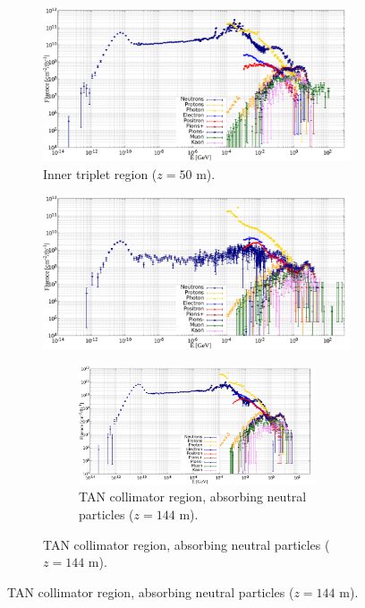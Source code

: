 \documentclass[encoding=utf8,british]{tumphthesis}
\begin{document}
\medskip

\begin{figure}[H]
    \centering 
\begin{subfigure}{0.69\textwidth}
    \centering
  \includegraphics[width=\linewidth]{results/particle_spectra_location_ITQ3.png}
  \caption{Inner triplet region ($z=50$ m).}
  \label{fig:LHC-particle-distributions-IT}
\end{subfigure}

\medskip

\begin{subfigure}{0.69\textwidth}
    \centering
  \includegraphics[width=\linewidth]{results/particle_spectra_location_TUN1.png}
  \caption{Tunnel location, unshielded ($z=100$ m).}
  \label{fig:LHC-particle-distributions-tunnel}


\medskip

\begin{subfigure}{0.69\textwidth}
    \centering
  \includegraphics[width=\linewidth]{results/particle_spectra_location_TAN.png}
  \caption{TAN collimator region, absorbing neutral particles ($z=144$ m).}
  \label{fig:LHC-particle-distributions-TAN}
\end{subfigure}


\end{subfigure}
\end{figure}
\end{document}
